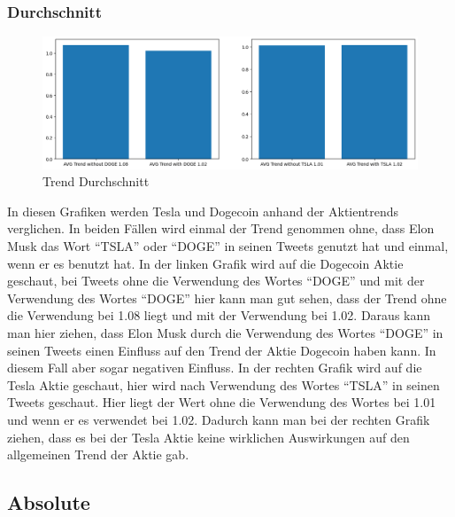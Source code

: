\documentclass{article}
\begin{document}
\subsubsection{Durchschnitt}
\begin{figure}[!htb]
  	\includegraphics[width=\textwidth, center]{./imgs/Trend_Durchschnitt.png}
 	\caption{Trend Durchschnitt}
 	\label{fig:Trend Durchschnitt}
\end{figure}
In diesen Grafiken werden Tesla und Dogecoin anhand der Aktientrends verglichen. In beiden Fällen wird einmal der Trend genommen ohne, dass Elon Musk das Wort ``TSLA'' oder ``DOGE'' in seinen Tweets genutzt hat und einmal, wenn er es benutzt hat.
In der linken Grafik wird auf die Dogecoin Aktie geschaut, bei Tweets ohne die Verwendung des Wortes ``DOGE'' und mit der Verwendung des Wortes ``DOGE'' hier kann man gut sehen, dass der Trend ohne die Verwendung bei 1.08 liegt und mit der Verwendung bei 1.02.
Daraus kann man hier ziehen, dass Elon Musk durch die Verwendung des Wortes ``DOGE'' in seinen Tweets einen Einfluss auf den Trend der Aktie Dogecoin haben kann. In diesem Fall aber sogar negativen Einfluss.
In der rechten Grafik wird auf die Tesla Aktie geschaut, hier wird nach Verwendung des Wortes ``TSLA'' in seinen Tweets geschaut. Hier liegt der Wert ohne die Verwendung des Wortes bei 1.01 und wenn er es verwendet bei 1.02.
Dadurch kann man bei der rechten Grafik ziehen, dass es bei der Tesla Aktie keine wirklichen Auswirkungen auf den allgemeinen Trend der Aktie gab.


\subsection{Absolute}
\end{document}
